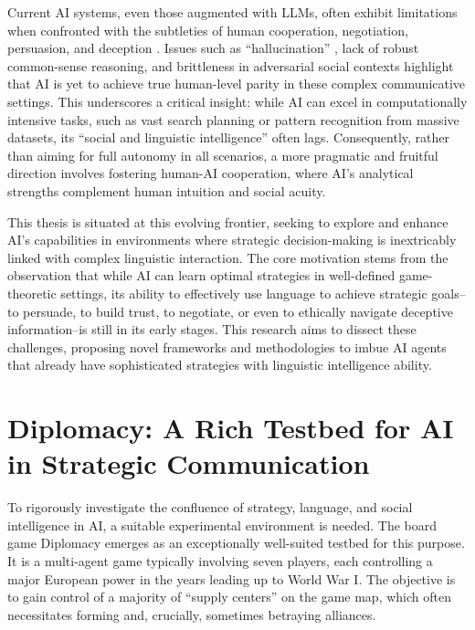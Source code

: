 \documentclass[oneside]{memoir}
\begin{document}
Current AI systems, even those augmented with LLMs, often exhibit limitations when confronted with the subtleties of human cooperation, negotiation, persuasion, and deception \citep{Wei2022EmergentAO}. Issues such as ``hallucination'' \citep{Ji2022SurveyOH}, lack of robust common-sense reasoning, and brittleness in adversarial social contexts highlight that AI is yet to achieve true human-level parity in these complex communicative settings. This underscores a critical insight: while AI can excel in computationally intensive tasks, such as vast search planning or pattern recognition from massive datasets, its ``social and linguistic intelligence'' often lags. Consequently, rather than aiming for full autonomy in all scenarios, a more pragmatic and fruitful direction involves fostering human-AI cooperation, where AI's analytical strengths complement human intuition and social acuity.

This thesis is situated at this evolving frontier, seeking to explore and enhance AI's capabilities in environments where strategic decision-making is inextricably linked with complex linguistic interaction. The core motivation stems from the observation that while AI can learn optimal strategies in well-defined game-theoretic settings, its ability to effectively use language to achieve strategic goals--to persuade, to build trust, to negotiate, or even to ethically navigate deceptive information--is still in its early stages. This research aims to dissect these challenges, proposing novel frameworks and methodologies to imbue AI agents that already have sophisticated strategies with linguistic intelligence ability.

\section{Diplomacy: A Rich Testbed for AI in Strategic Communication}

To rigorously investigate the confluence of strategy, language, and social intelligence in AI, a suitable experimental environment is needed. The board game Diplomacy emerges as an exceptionally well-suited testbed for this purpose. It is a multi-agent game typically involving seven players, each controlling a major European power in the years leading up to World War I. The objective is to gain control of a majority of ``supply centers'' on the game map, which often necessitates forming and, crucially, sometimes betraying alliances.
\end{document}
